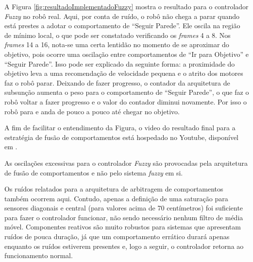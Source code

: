 	A Figura \ref{fig:resultadoImplementadoFuzzy} mostra o resultado para o controlador \textit{Fuzzy} no robô 
	real. Aqui, por conta de ruído, o robô não chega a parar quando está prestes a adotar o comportamento de 
	``Seguir Parede''. Ele oscila na região de mínimo local, o que pode ser constatado verificando os 
	\textit{frames} 4 a 8. Nos \textit{frames} 14 a 16, nota-se uma certa lentidão no momento de se aproximar do
	objetivo, pois ocorre uma oscilação entre comportamentos de ``Ir para Objetivo'' e ``Seguir Parede''. Isso 
	pode ser explicado da seguinte forma: a proximidade do objetivo leva a uma recomendação de velocidade pequena e
	o atrito dos motores faz o robô parar. Deixando de fazer progresso, o contador da arquitetura de subsunção 
	aumenta o peso para o comportamento de ``Seguir Parede'', o que faz o robô voltar a fazer progresso e o 
	valor do contador diminui novamente. Por isso o robô para e anda de pouco a pouco até chegar no objetivo.
	
	

	A fim de facilitar o entendimento da Figura, o video do resultado final para a 
	estratégia de fusão de comportamentos está hospedado no Youtube, disponível em 
	.
		
	As oscilações excessivas para o controlador \textit{Fuzzy} são provocadas pela arquitetura de fusão de 
	comportamentos e não pelo sistema \textit{fuzzy} em si.
	
	Os ruídos relatados para a arquitetura de arbitragem de comportamentos também ocorrem aqui. Contudo, apenas 
	a definição de uma saturação para sensores diagonais e central (para valores acima de 70 centímetros) foi 
	suficiente para fazer o controlador funcionar, não sendo necessário nenhum filtro de média móvel. Componentes 
	reativos são muito robustos para sistemas que apresentam ruídos de pouca duração, já que um comportamento 
	errático durará apenas enquanto os ruídos estiverem presentes e, logo a seguir, o controlador retorna ao 
	funcionamento normal.
	
%
